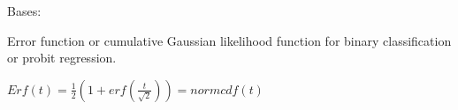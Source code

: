 \documentclass[letterpaper,10pt,english]{sphinxmanual}
\begin{document}
\begin{fulllineitems}
\label{pyGPs.Core:pyGPs.Core.lik.Erf}
Bases: {\hyperref[pyGPs.Core:pyGPs.Core.lik.Likelihood]{}}

Error function or cumulative Gaussian likelihood function for binary
classification or probit regression.

$Erf(t)=\frac{1}{2}(1+erf(\frac{t}{\sqrt{2}}))=normcdf(t)$

\begin{fulllineitems}
\label{pyGPs.Core:pyGPs.Core.lik.Erf.cumGauss}
\end{fulllineitems}


\begin{fulllineitems}
\label{pyGPs.Core:pyGPs.Core.lik.Erf.gauOverCumGauss}
\end{fulllineitems}


\begin{fulllineitems}
\label{pyGPs.Core:pyGPs.Core.lik.Erf.logphi}
\end{fulllineitems}


\begin{fulllineitems}
\label{pyGPs.Core:pyGPs.Core.lik.Erf.proceed}
\end{fulllineitems}


\end{fulllineitems}

\end{document}
